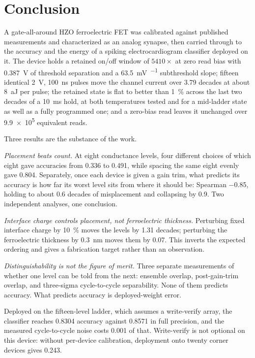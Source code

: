 \section{Conclusion}
\label{sec:conclusion}

A gate-all-around HZO ferroelectric FET was calibrated against published measurements and
characterized as an analog synapse, then carried through to the accuracy and the energy of
a spiking electrocardiogram classifier deployed on it. The device holds a retained on/off
window of $5410\times$ at zero read bias with \SI{0.387}{\volt} of threshold separation and
a \SI{63.5}{\milli\volt\per{}} subthreshold slope; fifteen identical
\SI{2}{\volt}, \SI{100}{\nano\second} pulses move the channel current over \num{3.79}
decades at about \SI{8}{\atto\joule} per pulse; the retained state is flat to better than
\SI{1}{\percent} across the last two decades of a \SI{10}{\milli\second} hold, at both
temperatures tested and for a mid-ladder state as well as a fully programmed one; and a
zero-bias read leaves it unchanged over \num{9.9e5} equivalent reads.

Three results are the substance of the work.

\emph{Placement beats count.} At eight conductance levels, four different choices of which
eight gave accuracies from \num{0.336} to \num{0.491}, while spacing the same eight evenly
gave \num{0.804}. Separately, once each device is given a gain trim, what predicts its
accuracy is how far its worst level sits from where it should be: Spearman \num{-0.85},
holding to about \num{0.6} decades of misplacement and collapsing by \num{0.9}. Two
independent analyses, one conclusion.

\emph{Interface charge controls placement, not ferroelectric thickness.} Perturbing fixed
interface charge by \SI{10}{\percent} moves the levels by \num{1.31} decades; perturbing the
ferroelectric thickness by \SI{0.3}{\nano\metre} moves them by \num{0.07}. This inverts the
expected ordering and gives a fabrication target rather than an observation.

\emph{Distinguishability is not the figure of merit.} Three separate measurements of
whether one level can be told from the next: ensemble overlap, post-gain-trim overlap,
and three-sigma cycle-to-cycle separability. None of them predicts accuracy. What
predicts accuracy is deployed-weight error.

Deployed on the fifteen-level ladder, which assumes a write-verify array, the classifier
reaches \num{0.8304} accuracy against \num{0.8571} in full precision, and the measured
cycle-to-cycle noise costs \num{0.001} of that. Write-verify is not optional on this
device: without per-device calibration, deployment onto twenty corner devices gives
\num{0.243}.

